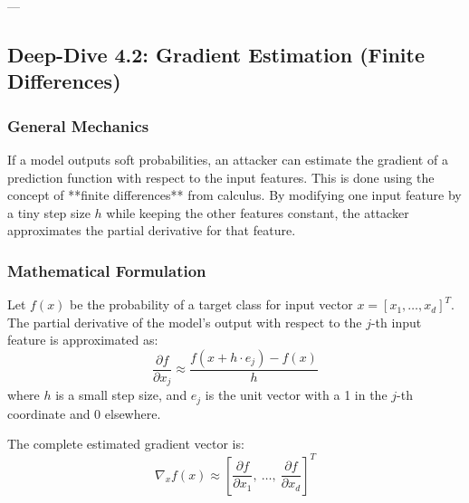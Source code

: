 \documentclass{article}
\begin{document}
---

\subsection{Deep-Dive 4.2: Gradient Estimation (Finite Differences)}

\subsubsection{General Mechanics}
If a model outputs soft probabilities, an attacker can estimate the gradient of a prediction function with respect to the input features. This is done using the concept of **finite differences** from calculus. By modifying one input feature by a tiny step size $h$ while keeping the other features constant, the attacker approximates the partial derivative for that feature.

\subsubsection{Mathematical Formulation}
Let $f(x)$ be the probability of a target class for input vector $x = [x_1, \dots, x_d]^T$. The partial derivative of the model's output with respect to the $j$-th input feature is approximated as:
\begin{equation}
    \frac{\partial f}{\partial x_j} \approx \frac{f(x + h \cdot e_j) - f(x)}{h}
\end{equation}
where $h$ is a small step size, and $e_j$ is the unit vector with a 1 in the $j$-th coordinate and 0 elsewhere.

The complete estimated gradient vector is:
\begin{equation}
    \nabla_x f(x) \approx \left[ \frac{\partial f}{\partial x_1}, \ \dots, \ \frac{\partial f}{\partial x_d} \right]^T
\end{equation}
\end{document}
